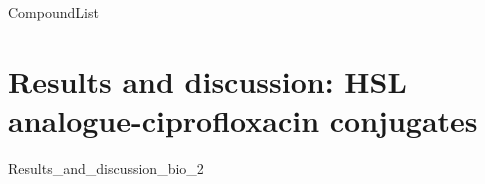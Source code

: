 \documentclass[10pt,a4paper]{article}
\begin{document}

{CompoundList}

\tableofcontents

%
%
%
\newpage
\section{Results and discussion: HSL analogue-ciprofloxacin conjugates\label{sec:HSLCipCs}}
{Results_and_discussion_bio_2}
%


\newpage
{}


\listoftodos
\end{document}
